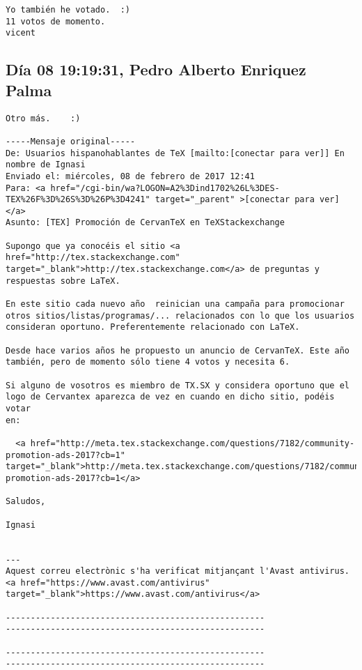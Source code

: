 \documentclass[a4paper,10pt]{article}
\begin{document}
\begin{lstlisting}
Yo también he votado.  :)
11 votos de momento.
vicent

\end{lstlisting}

\subsection{Día 08 19:19:31, Pedro Alberto Enriquez Palma}

\begin{lstlisting}
Otro más.    :) 
 
-----Mensaje original----- 
De: Usuarios hispanohablantes de TeX [mailto:[conectar para ver]] En nombre de Ignasi 
Enviado el: miércoles, 08 de febrero de 2017 12:41 
Para: <a href="/cgi-bin/wa?LOGON=A2%3Dind1702%26L%3DES-TEX%26F%3D%26S%3D%26P%3D4241" target="_parent" >[conectar para ver]</a> 
Asunto: [TEX] Promoción de CervanTeX en TeXStackexchange 
 
Supongo que ya conocéis el sitio <a href="http://tex.stackexchange.com" target="_blank">http://tex.stackexchange.com</a> de preguntas y respuestas sobre LaTeX. 
 
En este sitio cada nuevo año  reinician una campaña para promocionar otros sitios/listas/programas/... relacionados con lo que los usuarios consideran oportuno. Preferentemente relacionado con LaTeX. 
 
Desde hace varios años he propuesto un anuncio de CervanTeX. Este año también, pero de momento sólo tiene 4 votos y necesita 6. 
 
Si alguno de vosotros es miembro de TX.SX y considera oportuno que el logo de Cervantex aparezca de vez en cuando en dicho sitio, podéis votar 
en: 
 
  <a href="http://meta.tex.stackexchange.com/questions/7182/community-promotion-ads-2017?cb=1" target="_blank">http://meta.tex.stackexchange.com/questions/7182/community-promotion-ads-2017?cb=1</a> 
 
Saludos, 
 
Ignasi 
 
 
--- 
Aquest correu electrònic s'ha verificat mitjançant l'Avast antivirus. 
<a href="https://www.avast.com/antivirus" target="_blank">https://www.avast.com/antivirus</a> 
 
---------------------------------------------------- 
---------------------------------------------------- 
 
---------------------------------------------------- 
---------------------------------------------------- 
 
 

\end{lstlisting}
\end{document}
